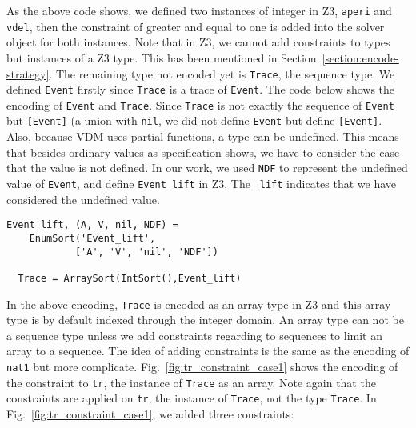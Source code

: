 As the above code shows, we defined two instances of integer in Z3, {\tt aperi} and {\tt vdel}, then the constraint of greater and equal to one is added into the solver object for both instances. Note that in Z3, we cannot add constraints to types but instances of a Z3 type. This has been mentioned in Section~\ref{section:encode-strategy}. The remaining type not encoded yet is {\tt Trace}, the sequence type. We defined {\tt Event} firstly since {\tt Trace} is a trace of {\tt Event}. The code below shows the encoding of {\tt Event} and {\tt Trace}. Since {\tt Trace} is not exactly the sequence of {\tt Event} but {\tt [Event]} (a union with {\tt nil}, we did not define {\tt Event} but define {\tt [Event]}. Also, because VDM uses partial functions, a type can be undefined. This means that besides ordinary values as specification shows, we have to consider the case that the value is not defined. In our work, we used {\tt NDF} to represent the undefined value of {\tt Event}, and define {\tt Event\_lift} in Z3. The {\tt \_lift} indicates that we have considered the undefined value.

\begin{mdframed}[roundcorner=5pt,shadow=true]
\begin{Verbatim}[fontsize=\small]
  Event_lift, (A, V, nil, NDF) = 
    EnumSort('Event_lift', 
            ['A', 'V', 'nil', 'NDF'])

  Trace = ArraySort(IntSort(),Event_lift)
\end{Verbatim}
\end{mdframed}

In the above encoding, {\tt Trace} is encoded as an array type in Z3 and this array type is by default indexed through the integer domain. An array type can not be a sequence type unless we add constraints regarding to sequences to limit an array to a sequence. The idea of adding constraints is the same as the encoding of {\tt nat1} but more complicate. Fig.~\ref{fig:tr_constraint_case1} shows the encoding of the constraint to {\tt tr}, the instance of {\tt Trace} as an array. Note again that the constraints are applied on {\tt tr}, the instance of {\tt Trace}, not the type {\tt Trace}. In Fig.~\ref{fig:tr_constraint_case1}, we added three constraints: 

